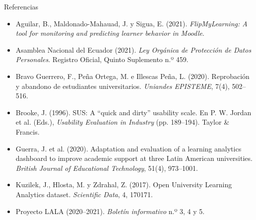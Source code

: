 \documentclass[aspectratio=169,10pt]{beamer}
\newcommand{\bloque}{}
\newcommand{\setbloque}[1]{\renewcommand{\bloque}{#1}}
\begin{document}
{
\begin{frame}
\end{frame}}

\setbloque{}
\begin{frame}{Referencias}
\scriptsize
\begin{itemize}
\setlength{\itemsep}{3pt}
\item Aguilar, B., Maldonado-Mahauad, J. y Sigua, E. (2021). \emph{FlipMyLearning: A tool for monitoring and predicting learner behavior in Moodle}.
\item Asamblea Nacional del Ecuador (2021). \emph{Ley Orgánica de Protección de Datos Personales}. Registro Oficial, Quinto Suplemento n.º 459.
\item Bravo Guerrero, F., Peña Ortega, M. e Illescas Peña, L. (2020). Reprobación y abandono de estudiantes universitarios. \emph{Uniandes EPISTEME}, 7(4), 502--516.
\item Brooke, J. (1996). SUS: A ``quick and dirty'' usability scale. En P. W. Jordan et al. (Eds.), \emph{Usability Evaluation in Industry} (pp. 189--194). Taylor \& Francis.
\item Guerra, J. et al. (2020). Adaptation and evaluation of a learning analytics dashboard to improve academic support at three Latin American universities. \emph{British Journal of Educational Technology}, 51(4), 973--1001.
\item Kuzilek, J., Hlosta, M. y Zdrahal, Z. (2017). Open University Learning Analytics dataset. \emph{Scientific Data}, 4, 170171.
\item Proyecto LALA (2020--2021). \emph{Boletín informativo} n.º 3, 4 y 5.
\end{itemize}
\end{frame}
\end{document}
